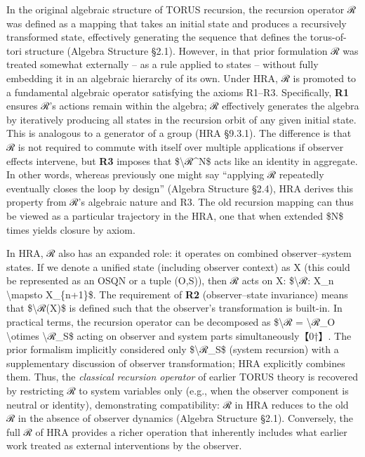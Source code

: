 \documentclass[]{article}
\begin{document}
In the original algebraic structure of TORUS recursion, the recursion
operator ℛ was defined as a mapping that takes an initial state and
produces a recursively transformed state, effectively generating the
sequence that defines the torus-of-tori structure (Algebra Structure
§2.1). However, in that prior formulation ℛ was treated somewhat
externally -- as a rule applied to states -- without fully embedding it
in an algebraic hierarchy of its own. Under HRA, ℛ is promoted to a
fundamental algebraic operator satisfying the axioms R1--R3.
Specifically, \textbf{R1} ensures ℛ's actions remain within the algebra;
ℛ effectively generates the algebra by iteratively producing all states
in the recursion orbit of any given initial state. This is analogous to
a generator of a group (HRA §9.3.1). The difference is that ℛ is not
required to commute with itself over multiple applications if observer
effects intervene, but \textbf{R3} imposes that
\$\textbackslash{}ℛ\^{}N\$ acts like an identity in aggregate. In other
words, whereas previously one might say ``applying ℛ repeatedly
eventually closes the loop by design'' (Algebra Structure §2.4), HRA
derives this property from ℛ's algebraic nature and R3. The old
recursion mapping can thus be viewed as a particular trajectory in the
HRA, one that when extended \$N\$ times yields closure by axiom.

In HRA, ℛ also has an expanded role: it operates on combined
observer--system states. If we denote a unified state (including
observer context) as X (this could be represented as an OSQN or a tuple
(O,S)), then ℛ acts on X: \$\textbackslash{}ℛ: X\_n
\textbackslash{}mapsto X\_\{n+1\}\$. The requirement of \textbf{R2}
(observer--state invariance) means that \$\textbackslash{}ℛ(X)\$ is
defined such that the observer's transformation is built-in. In
practical terms, the recursion operator can be decomposed as
\$\textbackslash{}ℛ = \textbackslash{}ℛ\_O \textbackslash{}otimes
\textbackslash{}ℛ\_S\$ acting on observer and system parts
simultaneously【0†】. The prior formalism implicitly considered only
\$\textbackslash{}ℛ\_S\$ (system recursion) with a supplementary
discussion of observer transformation; HRA explicitly combines them.
Thus, the \emph{classical recursion operator} of earlier TORUS theory is
recovered by restricting ℛ to system variables only (e.g., when the
observer component is neutral or identity), demonstrating compatibility:
ℛ in HRA reduces to the old ℛ in the absence of observer dynamics
(Algebra Structure §2.1). Conversely, the full ℛ of HRA provides a
richer operation that inherently includes what earlier work treated as
external interventions by the observer.
\end{document}
